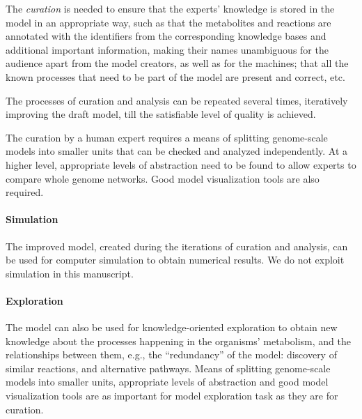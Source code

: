 \documentclass{bmcart}
\begin{document}
The \emph{curation} is needed to %
ensure that the experts' knowledge is stored in the model in an appropriate way, such as that the metabolites and reactions are annotated with the identifiers from the corresponding knowledge bases and additional important information, making their names unambiguous for the audience apart from the model creators, as well as for the machines; that all the known processes that need to be part of the model are present and correct, etc.

The processes of curation and analysis can be repeated several times, iteratively improving the draft model, till the satisfiable level of quality is achieved.

The curation by a human expert requires a means of splitting genome-scale models into smaller units that can be checked and analyzed independently. At a higher level, appropriate levels of abstraction need to be found to allow experts to compare whole genome networks. Good model visualization tools are also required.

\paragraph{Simulation}
The improved model, created during the iterations of curation and analysis, %
can be used for computer simulation to obtain numerical results. We do not exploit simulation in this manuscript.

\paragraph{Exploration}
The model can also be used for knowledge-oriented exploration to obtain new knowledge about the processes happening in the organisms' metabolism, and the relationships between them, e.g., the ``redundancy'' of the model: discovery of similar reactions, and alternative pathways. 
Means of splitting genome-scale models into smaller units, appropriate levels of abstraction and good model visualization tools are as important for model exploration task as they are for curation.
\end{document}
